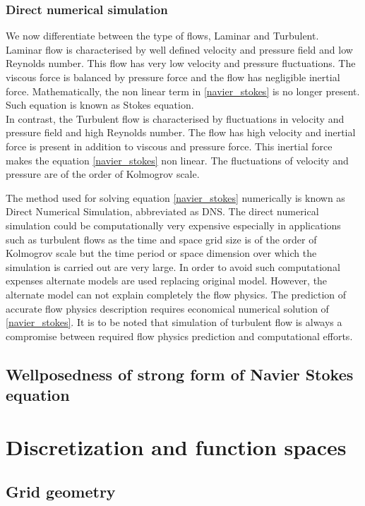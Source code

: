 \documentclass[a4paper,10pt]{book}
\begin{document}
\subsection{Direct numerical simulation} 

We now differentiate between the type of flows, Laminar and Turbulent.\\
Laminar flow is characterised by well defined velocity and pressure field and low Reynolds number. This flow has very low velocity and pressure fluctuations. The viscous force is balanced by pressure force and the flow has negligible inertial force. Mathematically, the non linear term in \eqref{navier_stokes} is no longer present. Such equation is known as Stokes equation.\\

In contrast, the Turbulent flow is characterised by fluctuations in velocity and pressure field and high Reynolds number. The flow has high velocity and inertial force is present in addition to viscous and pressure force. This inertial force makes the equation \eqref{navier_stokes} non linear. The fluctuations of velocity and pressure are of the order of Kolmogrov scale.

The method used for solving equation \eqref{navier_stokes} numerically is known as Direct Numerical Simulation, abbreviated as DNS. The direct numerical simulation could be computationally very expensive especially in applications such as turbulent flows as the time and space grid size is of the order of Kolmogrov scale but the time period or space dimension over which the simulation is carried out are very large. In order to avoid such computational expenses alternate models are used replacing original model. However, the alternate model can not explain completely the flow physics. The prediction of accurate flow physics description requires economical numerical solution of \eqref{navier_stokes}. It is to be noted that simulation of turbulent flow is always a compromise between required flow physics prediction and computational efforts.

\section{Wellposedness of strong form of Navier Stokes equation}

\chapter{Discretization and function spaces}
\section{Grid geometry}
\end{document}
